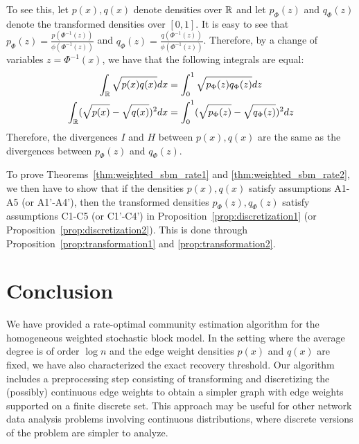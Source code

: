 \documentclass{article}
\begin{document}
To see this, let $p(x), q(x)$ denote densities over ${\mathbb R}$ and let $p_{\Phi}(z)$ and $q_{\Phi}(z)$ denote the transformed densities over $[0,1]$. It is easy to see that $p_{\Phi}(z) = \frac{p(\Phi^{-1}(z))}{\phi(\Phi^{-1}(z))}$ and $q_{\Phi}(z) = \frac{q(\Phi^{-1}(z))}{\phi(\Phi^{-1}(z))}$. Therefore, by a change of variables $z = \Phi^{-1}(x)$, we have that the following integrals are equal:
\begin{align*}
\int_{\mathbb R} \sqrt{p(x)q(x)} dx &= \int_0^1 \sqrt{p_{\Phi}(z) q_{\Phi}(z)} dz \\
\int_{\mathbb R} (\sqrt{p(x)} - \sqrt{q(x)})^2 dx &= \int_0^1 (\sqrt{p_{\Phi}(z)} -\sqrt{q_{\Phi}(z)})^2 dz 
\end{align*}
Therefore, the divergences $I$ and $H$ between $p(x), q(x)$ are the same as the divergences between $p_{\Phi}(z)$ and $q_{\Phi}(z)$.

To prove Theorems~\ref{thm:weighted_sbm_rate1} and \ref{thm:weighted_sbm_rate2}, we then have to show that if the densities $p(x), q(x)$ satisfy assumptions A1-A5 (or A1'-A4'), then the transformed densities $p_{\Phi}(z), q_{\Phi}(z)$ satisfy assumptions C1-C5 (or C1'-C4') in Proposition~\ref{prop:discretization1} (or Proposition~\ref{prop:discretization2}). This is done through Proposition~\ref{prop:transformation1} and \ref{prop:transformation2}.







\section{Conclusion}
\label{sec:conclusion}

We have provided a rate-optimal community estimation algorithm for the homogeneous weighted stochastic block model. In the setting where the average degree is of order $\log n$ and the edge weight densities $p(x)$ and $q(x)$ are fixed, we have also characterized the exact recovery threshold. Our algorithm includes a preprocessing step consisting of transforming and discretizing the (possibly) continuous edge weights to obtain a simpler graph with edge weights supported on a finite discrete set. This approach may be useful for other network data analysis problems involving continuous distributions, where discrete versions of the problem are simpler to analyze.
\end{document}
